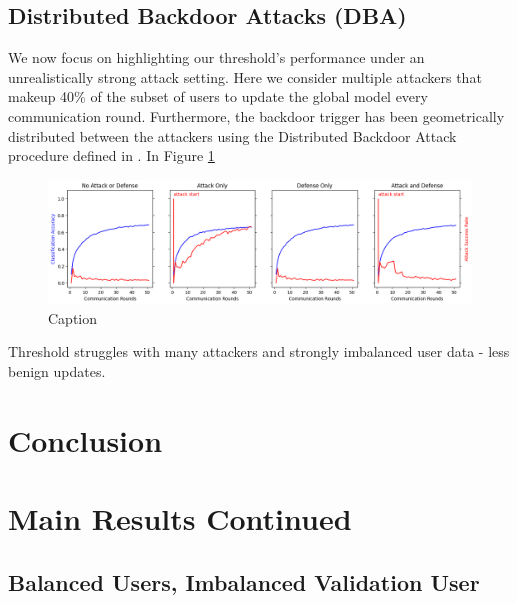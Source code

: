 \documentclass{article} %
\begin{document}
\subsection{Distributed Backdoor Attacks (DBA)}

We now focus on highlighting our threshold's performance under an unrealistically strong attack setting. Here we consider multiple attackers that makeup 40\% of the subset of users to update the global model every communication round. Furthermore, the backdoor trigger has been geometrically distributed between the attackers using the Distributed Backdoor Attack procedure defined in \cite{dba}. In Figure \ref{fig:distributed--alpha10000--alpha_val10000--accuracy}

\begin{figure}[H]
    \centering
    \includegraphics[width=\textwidth]{01_trusted/distributed/alpha10000--alpha_val10000/visuals/accuracy--n_malicious4--m_start1.png}
    \caption{Caption}
    \label{fig:distributed--alpha10000--alpha_val10000--accuracy}
\end{figure}

Threshold struggles with many attackers and strongly imbalanced user data - less benign updates.

% 
\section{Conclusion}

%



%
\appendix

%
\section{Main Results Continued}

%
\subsection{Balanced Users, Imbalanced Validation User}
\label{sec.imbal_val}
\end{document}

